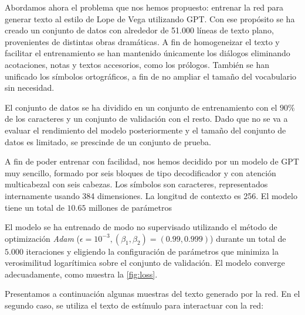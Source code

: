 Abordamos ahora el problema que nos hemos propuesto: entrenar la red para generar texto al estilo de Lope de Vega utilizando GPT. Con ese propósito se ha creado un conjunto de datos con alrededor de 51.000 líneas de texto plano, provenientes de distintas obras dramáticas. A fin de homogeneizar el texto y facilitar el entrenamiento se han mantenido únicamente los diálogos eliminando acotaciones, notas y textos accesorios, como los prólogos. También se han unificado los símbolos ortográficos, a fin de no ampliar el tamaño del vocabulario sin necesidad.

El conjunto de datos se ha dividido en un conjunto de entrenamiento con el \( 90\% \) de los caracteres y un conjunto de validación con el resto. Dado que no se va a evaluar el rendimiento del modelo posteriormente y el tamaño del conjunto de datos es limitado, se prescinde de un conjunto de prueba.

A fin de poder entrenar con facilidad, nos hemos decidido por un modelo de GPT muy sencillo, formado por seis bloques de tipo decodificador y con atención multicabezal con seis cabezas. Los símbolos son caracteres, representados internamente usando 384 dimensiones. La longitud de contexto es 256. El modelo tiene un total de \( 10.65 \) millones de parámetros

El modelo se ha entrenado de modo no supervisado utilizando el método de optimización \textit{Adam} (\( \epsilon = 10^{-3}, (\beta_1, \beta_2) = (0.99, 0.999) \)) durante un total de \( 5.000 \) iteraciones y eligiendo la configuración de parámetros que minimiza la verosimilitud logarítimica sobre el conjunto de validación. El modelo converge adecuadamente, como muestra la \cref{fig:loss}.

Presentamos a continuación algunas muestras del texto generado por la red. En el segundo caso, se utiliza el texto de estímulo para interactuar con la red: 

